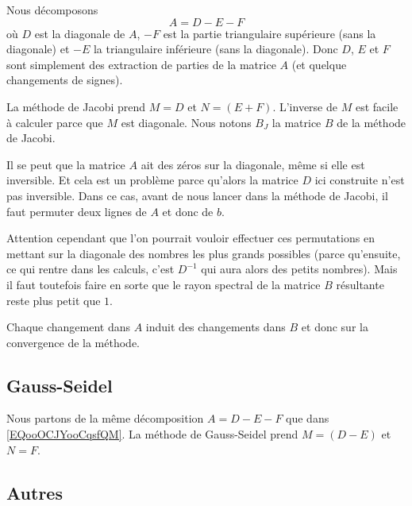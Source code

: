 Nous décomposons  
\begin{equation}        \label{EQooOCJYooCqsfQM}
    A=D-E-F
\end{equation}
où \( D\) est la diagonale de \( A\), \( -F\) est la partie triangulaire supérieure (sans la diagonale) et \( -E\) la triangulaire inférieure (sans la diagonale). Donc \( D\), \( E\) et \( F\) sont simplement des extraction de parties de la matrice \( A\) (et quelque changements de signes).

La méthode de Jacobi prend \( M=D\) et \( N=(E+F)\). L'inverse de \( M\) est facile à calculer parce que \( M\) est diagonale. Nous notons \( B_J\) la matrice \( B\) de la méthode de Jacobi.

\begin{remark}
    Il se peut que la matrice \( A\) ait des zéros sur la diagonale, même si elle est inversible. Et cela est un problème parce qu'alors la matrice \( D\) ici construite n'est pas inversible. Dans ce cas, avant de nous lancer dans la méthode de Jacobi, il faut permuter deux lignes de \( A\) et donc de \( b\).

    Attention cependant que l'on pourrait vouloir effectuer ces permutations en mettant sur la diagonale des nombres les plus grands possibles (parce qu'ensuite, ce qui rentre dans les calculs, c'est \( D^{-1}\) qui aura alors des petits nombres). Mais il faut toutefois faire en sorte que le rayon spectral de la matrice \(B \) résultante reste plus petit que \( 1\).

    Chaque changement dans \( A\) induit des changements dans \( B\) et donc sur la convergence de la méthode.
\end{remark}

\subsection{Gauss-Seidel}

Nous partons de la même décomposition \( A=D-E-F\) que dans \eqref{EQooOCJYooCqsfQM}. La méthode de Gauss-Seidel prend \( M=(D-E)\) et \( N=F\).

\subsection{Autres}

